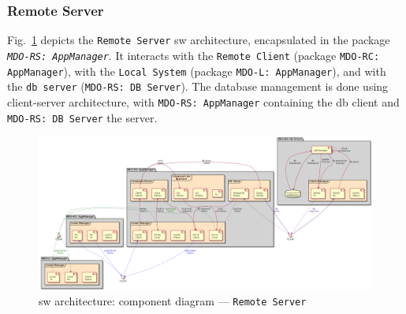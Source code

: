 \subsubsection{Remote Server}
\label{sec:remote-server-arch}
Fig.~\ref{fig:component-diag-rs} depicts the \texttt{Remote Server} \gls{sw} architecture, encapsulated in the package
\emph{\texttt{MDO-RS: AppManager}}. It interacts with the \texttt{Remote Client}
(package \texttt{MDO-RC: AppManager}), with the \texttt{Local System} (package
\texttt{MDO-L: AppManager}), and with the \texttt{\gls{db} server}
(\texttt{MDO-RS: DB Server}). The database management is done using
client-server architecture, with \texttt{MDO-RS: AppManager} containing the
\gls{db} client and \texttt{MDO-RS: DB Server} the server.
%
\begin{figure}[htb!]
\centering
    \includegraphics[width=1.0\columnwidth]{./img/component-diag-rs.png}
  \caption{\gls{sw} architecture: component diagram --- \texttt{Remote Server}}%
\label{fig:component-diag-rs}
\end{figure}

